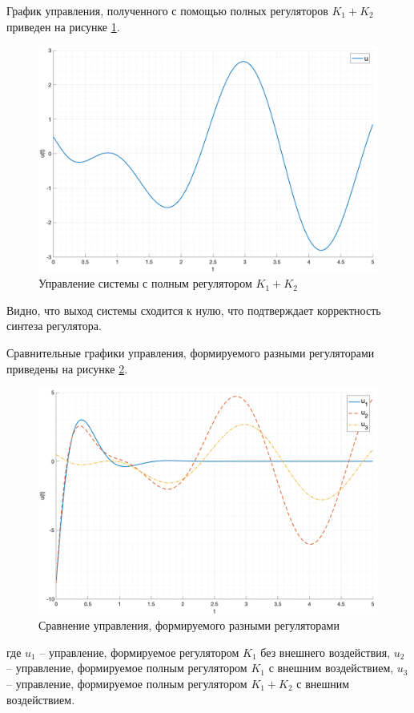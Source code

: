 График управления, полученного с помощью полных регуляторов $K_1 + K_2$ приведен на рисунке \ref{fig:K_full_u}.
\begin{figure}[ht!]
    \centering
    \includegraphics[width=\textwidth]{media/plots/full_u.png}
    \caption{Управление системы с полным регулятором $K_1 + K_2$}
    \label{fig:K_full_u}
\end{figure}
Видно, что выход системы сходится к нулю, что подтверждает корректность синтеза регулятора. 
\FloatBarrier

Сравнительные графики управления, формируемого разными регуляторами приведены на рисунке \ref{fig:compare_u}.
\begin{figure}[ht!]
    \centering
    \includegraphics[width=\textwidth]{media/plots/u_cmp.png}
    \caption{Сравнение управления, формируемого разными регуляторами}
    \label{fig:compare_u}
\end{figure}
где $u_1$ -- управление, формируемое регулятором $K_1$ без внешнего воздействия, $u_2$ -- управление, формируемое полным регулятором $K_1$ 
с внешним воздействием, $u_3$ -- управление, формируемое полным регулятором $K_1 + K_2$ с внешним воздействием.

